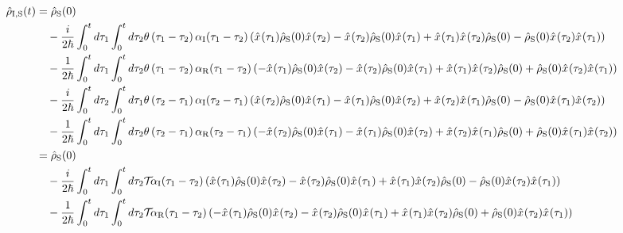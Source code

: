 \documentclass[10pt, a4paper]{jsarticle}
\begin{document}
\begin{equation}
\begin{split}
\label{eq:510}
	\hat{\rho}_{\rm I,S}(t) &= \hat{\rho}_{\rm S}(0) \\
		&\quad - \dfrac{i}{2 \hbar} \int_{0}^{t} d\tau_{1} \int_{0}^{t} d\tau_{2} \theta \left( \tau_{1} - \tau_{2} \right) \alpha_{\rm I}(\tau_{1} - \tau_{2}) \left( \hat{x}_{}(\tau_{1}) \hat{\rho}_{\rm S}(0) \hat{x}_{}(\tau_{2}) - \hat{x}_{}(\tau_{2}) \hat{\rho}_{\rm S}(0) \hat{x}_{}(\tau_{1}) + \hat{x}_{}(\tau_{1}) \hat{x}_{}(\tau_{2}) \hat{\rho}_{\rm S}(0) - \hat{\rho}_{\rm S}(0) \hat{x}_{}(\tau_{2}) \hat{x}_{}(\tau_{1}) \right) \\
		&\quad - \dfrac{1}{2 \hbar} \int_{0}^{t} d\tau_{1} \int_{0}^{t} d\tau_{2} \theta \left( \tau_{1} - \tau_{2} \right) \alpha_{\rm R}(\tau_{1} - \tau_{2}) \left( - \hat{x}_{}(\tau_{1}) \hat{\rho}_{\rm S}(0) \hat{x}_{}(\tau_{2}) - \hat{x}_{}(\tau_{2}) \hat{\rho}_{\rm S}(0) \hat{x}_{}(\tau_{1}) + \hat{x}_{}(\tau_{1}) \hat{x}_{}(\tau_{2}) \hat{\rho}_{\rm S}(0) + \hat{\rho}_{\rm S}(0) \hat{x}_{}(\tau_{2}) \hat{x}_{}(\tau_{1}) \right) \\
		&\quad - \dfrac{i}{2 \hbar} \int_{0}^{t} d\tau_{2} \int_{0}^{t} d\tau_{1} \theta \left( \tau_{2} - \tau_{1} \right) \alpha_{\rm I}(\tau_{2} - \tau_{1}) \left( \hat{x}_{}(\tau_{2}) \hat{\rho}_{\rm S}(0) \hat{x}_{}(\tau_{1}) - \hat{x}_{}(\tau_{1}) \hat{\rho}_{\rm S}(0) \hat{x}_{}(\tau_{2}) + \hat{x}_{}(\tau_{2}) \hat{x}_{}(\tau_{1}) \hat{\rho}_{\rm S}(0) - \hat{\rho}_{\rm S}(0) \hat{x}_{}(\tau_{1}) \hat{x}_{}(\tau_{2}) \right) \\
		&\quad - \dfrac{1}{2 \hbar} \int_{0}^{t} d\tau_{1} \int_{0}^{t} d\tau_{2} \theta \left( \tau_{2} - \tau_{1} \right) \alpha_{\rm R}(\tau_{2} - \tau_{1}) \left( - \hat{x}_{}(\tau_{2}) \hat{\rho}_{\rm S}(0) \hat{x}_{}(\tau_{1}) - \hat{x}_{}(\tau_{1}) \hat{\rho}_{\rm S}(0) \hat{x}_{}(\tau_{2}) + \hat{x}_{}(\tau_{2}) \hat{x}_{}(\tau_{1}) \hat{\rho}_{\rm S}(0) + \hat{\rho}_{\rm S}(0) \hat{x}_{}(\tau_{1}) \hat{x}_{}(\tau_{2}) \right) \\
		&=  \hat{\rho}_{\rm S}(0) \\
		&\quad - \dfrac{i}{2 \hbar} \int_{0}^{t} d\tau_{1} \int_{0}^{t} d\tau_{2} \mathcal{T}_{} \alpha_{\rm I}(\tau_{1} - \tau_{2}) \left( \hat{x}_{}(\tau_{1}) \hat{\rho}_{\rm S}(0) \hat{x}_{}(\tau_{2}) - \hat{x}_{}(\tau_{2}) \hat{\rho}_{\rm S}(0) \hat{x}_{}(\tau_{1}) + \hat{x}_{}(\tau_{1}) \hat{x}_{}(\tau_{2}) \hat{\rho}_{\rm S}(0) - \hat{\rho}_{\rm S}(0) \hat{x}_{}(\tau_{2}) \hat{x}_{}(\tau_{1}) \right) \\
		&\quad - \dfrac{1}{2 \hbar} \int_{0}^{t} d\tau_{1} \int_{0}^{t} d\tau_{2} \mathcal{T}_{} \alpha_{\rm R}(\tau_{1} - \tau_{2}) \left( - \hat{x}_{}(\tau_{1}) \hat{\rho}_{\rm S}(0) \hat{x}_{}(\tau_{2}) - \hat{x}_{}(\tau_{2}) \hat{\rho}_{\rm S}(0) \hat{x}_{}(\tau_{1}) + \hat{x}_{}(\tau_{1}) \hat{x}_{}(\tau_{2}) \hat{\rho}_{\rm S}(0) + \hat{\rho}_{\rm S}(0) \hat{x}_{}(\tau_{2}) \hat{x}_{}(\tau_{1}) \right)
\end{split}
\end{equation}
\end{document}
